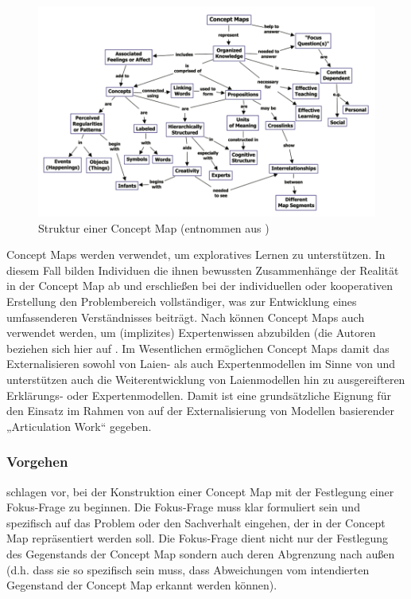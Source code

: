 \begin{figure}[htbp]
	\centering
		\includegraphics[width=12cm]{img/MentaleModelle/novak_concept_maps.png}
	\caption[Struktur einer Concept Map]{Struktur einer Concept Map (entnommen aus \citep[][S. 2]{Novak06})}
	\label{fig:img_MentaleModelle_novak_concept_maps}
\end{figure}

Concept Maps werden verwendet, um exploratives Lernen zu unterstützen. In diesem Fall bilden Individuen die ihnen bewussten Zusammenhänge der Realität in der Concept Map ab und erschließen bei der individuellen oder kooperativen Erstellung den Problembereich vollständiger, was zur Entwicklung eines umfassenderen Verständnisses beiträgt. Nach \citep{Novak06} können Concept Maps auch verwendet werden, um (implizites) Expertenwissen abzubilden (die Autoren beziehen sich hier auf \citep{Nonaka95}. Im Wesentlichen ermöglichen Concept Maps damit das Externalisieren sowohl von Laien- als auch Expertenmodellen im Sinne von \citep{Seel91} und unterstützen auch die Weiterentwicklung von Laienmodellen hin zu ausgereifteren Erklärungs- oder Expertenmodellen.  Damit ist eine grundsätzliche Eignung für den Einsatz im Rahmen von auf der Externalisierung von Modellen basierender „Articulation Work“ gegeben.

\subsubsection{Vorgehen}

\citet{Novak06} schlagen vor, bei der Konstruktion einer Concept Map mit der Festlegung einer Fokus-Frage zu beginnen. Die Fokus-Frage muss klar formuliert sein und spezifisch auf das Problem oder den Sachverhalt eingehen, der in der Concept Map repräsentiert werden soll. Die Fokus-Frage dient nicht nur der Festlegung des Gegenstands der Concept Map sondern auch deren Abgrenzung nach außen (d.h. dass sie so spezifisch sein muss, dass Abweichungen vom intendierten Gegenstand der Concept Map erkannt werden können).

